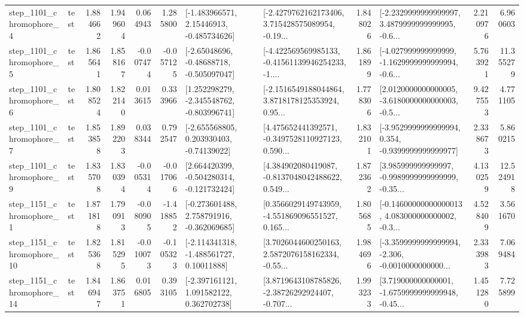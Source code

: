 \begin{tabular}{llrrrrllrlrr}
  step\_1101\_chromophore\_4 &      test &      1.884662 &    1.949604 &      0.064943 &  1.285800 &    [-1.483966571, 2.15446913, -0.485734626] &  [-2.4279762162173406, 3.715428575089954, -0.19... &       1.848026 &  [-2.2329999999999997, 3.4879999999999995, -0.6... &            2.210976 &          6.960603 \\
  step\_1101\_chromophore\_5 &      test &      1.865641 &    1.858167 &     -0.007474 & -0.057125 &    [-2.65048696, -0.48688718, -0.505097047] &  [-4.422569569985133, -0.41561139946254233, -1.... &       1.861899 &  [-4.027999999999999, -1.1629999999999994, -0.6... &            5.763921 &         11.355279 \\
  step\_1101\_chromophore\_6 &      test &      1.808524 &    1.822140 &      0.013615 &  0.333966 &   [1.252298279, -2.345548762, -0.803996741] &  [-2.1516549188044864, 3.8718178125353924, 0.95... &       1.778306 &  [2.0120000000000005, -3.6180000000000003, -0.5... &            9.427553 &          4.771105 \\
  step\_1101\_chromophore\_7 &      test &      1.853858 &    1.892203 &      0.038344 &  0.792547 &    [-2.655568805, 0.203930403, -0.74139022] &  [4.475652441392571, -0.3497528110927123, 0.590... &       1.832101 &  [-3.9529999999999994, 0.354, -0.9399999999999977] &            2.338673 &          5.860215 \\
  step\_1101\_chromophore\_9 &      test &      1.835708 &    1.830394 &     -0.005314 & -0.017066 &   [2.664420399, -0.504280314, -0.121732424] &  [4.384902080419087, -0.8137048042488622, 0.549... &       1.872362 &  [3.985999999999997, -0.9989999999999999, -0.35... &            4.130259 &         12.524918 \\
  step\_1151\_chromophore\_1 &      test &      1.871818 &    1.790913 &     -0.080905 & -1.418852 &   [-0.273601488, 2.758791916, -0.362069685] &  [0.3566029149743959, -4.551869096551527, 0.165... &       1.805685 &  [-0.14600000000000013, 4.083000000000002, -0.3... &            4.528409 &          3.561670 \\
 step\_1151\_chromophore\_10 &      test &      1.825368 &    1.815295 &     -0.010073 & -0.105323 &    [-2.114341318, -1.488561727, 0.10011888] &  [3.7026044600250163, 2.5872076158162334, -0.55... &       1.984696 &  [-3.3599999999999994, -2.306, -0.0010000000000... &            2.333983 &          7.069484 \\
 step\_1151\_chromophore\_14 &      test &      1.846947 &    1.863751 &      0.016805 &  0.393105 &    [-2.397161121, 1.091582122, 0.362702738] &  [3.8719643108785826, -2.38726292924407, -0.707... &       1.993233 &  [3.719000000000001, -1.6759999999999948, -0.45... &            1.451280 &          7.725899 \\

\end{tabular}

